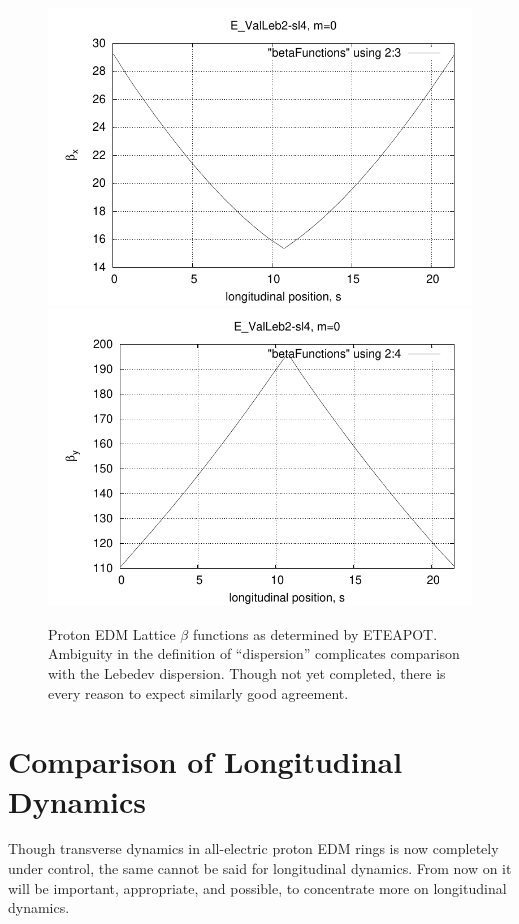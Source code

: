 \documentclass[12]{article}
\begin{document}
\begin{figure}[h]
\centering
\includegraphics[scale=0.55]{ETEAPOT_ValLeb2-sl4betax.pdf}
\includegraphics[scale=0.55]{ETEAPOT_ValLeb2-sl4betay.pdf}
\caption{\label{ETEAPOT-twiss}Proton EDM Lattice $\beta$ functions as determined by
ETEAPOT. Ambiguity in the definition of ``dispersion'' complicates comparison
with the Lebedev dispersion. Though not yet completed, there is every reason to
expect similarly good agreement.}
\end{figure}

\clearpage

\section{Comparison of Longitudinal Dynamics}
Though transverse dynamics in all-electric proton EDM rings is now 
completely under control, the same cannot be said for longitudinal
dynamics.  From now on it will be important, appropriate, and possible, 
to concentrate more on longitudinal dynamics.  
\end{document}
